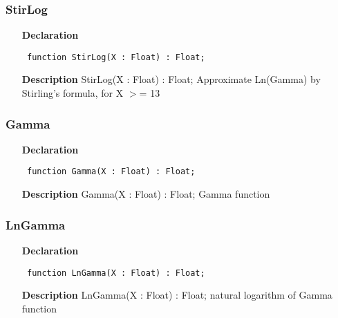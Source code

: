 \documentclass[12pt,a4paper,oneside]{report}
\newcommand{\declarationitem}[1]{\textbf{#1}}
\newcommand{\descriptiontitle}[1]{\textbf{#1}}
\newcommand{\code}[1]{\texttt{#1}}
\begin{document}
\subsubsection{StirLog}
\label{ugamma-StirLog}
\begin{itemize}\item[\declarationitem{Declaration}\hfill]
	\begin{flushleft}
		\code{
			function StirLog(X : Float) : Float;}
		
	\end{flushleft}
	
	\par
	\item[\descriptiontitle{Description}]
	StirLog(X : Float) : Float; Approximate Ln(Gamma) by Stirling's formula, for X {$>$}= 13
	
\end{itemize}
\subsubsection{Gamma}
\label{ugamma-Gamma}
\begin{itemize}\item[\declarationitem{Declaration}\hfill]
	\begin{flushleft}
		\code{
			function Gamma(X : Float) : Float;}
		
	\end{flushleft}
	
	\par
	\item[\descriptiontitle{Description}]
	Gamma(X : Float) : Float; Gamma function
	
\end{itemize}
\subsubsection{LnGamma}
\label{ugamma-LnGamma}
\begin{itemize}\item[\declarationitem{Declaration}\hfill]
	\begin{flushleft}
		\code{
			function LnGamma(X : Float) : Float;}
		
	\end{flushleft}
	
	\par
	\item[\descriptiontitle{Description}]
	LnGamma(X : Float) : Float; natural logarithm of Gamma function
	
\end{itemize}
\end{document}

